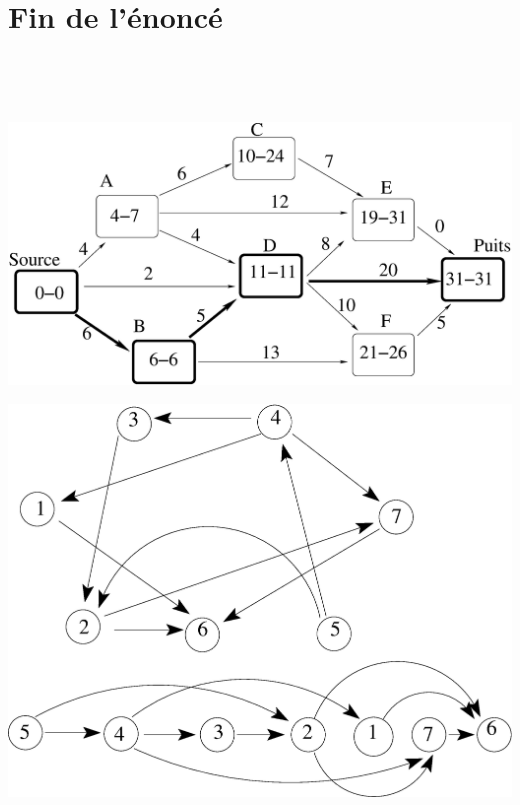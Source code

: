 \documentclass[11pt]{article}
\begin{document}
\section*{Fin de l'énoncé}

\newpage
~


~

\newpage
\begin{center}
\includegraphics[width=0.75\linewidth]{critique2_solution.eps}
\end{center}

\begin{center}
\includegraphics[width=0.6\linewidth]{tritopologique_corrige.eps}
\end{center}
\end{document}
